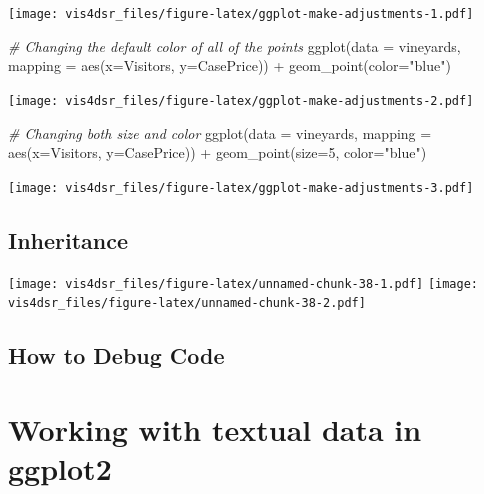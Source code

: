 \documentclass[
]{krantz}
\makeatletter
\newenvironment{Shaded}{\begin{snugshade}}{\end{snugshade}}
\newcommand{\AttributeTok}[1]{\textcolor[rgb]{0.61,0.61,0.61}{#1}}
\newcommand{\CommentTok}[1]{\textcolor[rgb]{0.37,0.37,0.37}{\textit{#1}}}
\newcommand{\DecValTok}[1]{\textcolor[rgb]{0.06,0.06,0.06}{#1}}
\newcommand{\FunctionTok}[1]{\textcolor[rgb]{0,0,0}{#1}}
\newcommand{\NormalTok}[1]{#1}
\newcommand{\SpecialCharTok}[1]{\textcolor[rgb]{0,0,0}{#1}}
\newcommand{\StringTok}[1]{\textcolor[rgb]{0.5,0.5,0.5}{#1}}
\newenvironment{kframe}{%
\medskip{}
\setlength{\fboxsep}{.8em}
 \def\at@end@of@kframe{}%
 \ifinner\ifhmode%
  \def\at@end@of@kframe{\end{minipage}}%
  \begin{minipage}{\columnwidth}%
 \fi\fi%
 \def\FrameCommand##1{\hskip\@totalleftmargin \hskip-\fboxsep
 \colorbox{shadecolor}{##1}\hskip-\fboxsep
     \hskip-\linewidth \hskip-\@totalleftmargin \hskip\columnwidth}%
 \MakeFramed {\advance\hsize-\width
   \@totalleftmargin\z@ \linewidth\hsize
   \@setminipage}}%
 {\par\unskip\endMakeFramed%
 \at@end@of@kframe}
\renewenvironment{Shaded}{\begin{kframe}}{\end{kframe}}
\makeatother
\begin{document}
\texttt{[image: vis4dsr\_files/figure-latex/ggplot-make-adjustments-1.pdf]}

\begin{Shaded}
\begin{Highlighting}[]
\CommentTok{\# Changing the default color of all of the points}
\FunctionTok{ggplot}\NormalTok{(}\AttributeTok{data =}\NormalTok{ vineyards, }\AttributeTok{mapping =} \FunctionTok{aes}\NormalTok{(}\AttributeTok{x=}\NormalTok{Visitors, }\AttributeTok{y=}\NormalTok{CasePrice)) }\SpecialCharTok{+}
  \FunctionTok{geom\_point}\NormalTok{(}\AttributeTok{color=}\StringTok{"blue"}\NormalTok{)}
\end{Highlighting}
\end{Shaded}

\texttt{[image: vis4dsr\_files/figure-latex/ggplot-make-adjustments-2.pdf]}

\begin{Shaded}
\begin{Highlighting}[]
\CommentTok{\# Changing both size and color}
\FunctionTok{ggplot}\NormalTok{(}\AttributeTok{data =}\NormalTok{ vineyards, }\AttributeTok{mapping =} \FunctionTok{aes}\NormalTok{(}\AttributeTok{x=}\NormalTok{Visitors, }\AttributeTok{y=}\NormalTok{CasePrice)) }\SpecialCharTok{+}
  \FunctionTok{geom\_point}\NormalTok{(}\AttributeTok{size=}\DecValTok{5}\NormalTok{, }\AttributeTok{color=}\StringTok{"blue"}\NormalTok{)}
\end{Highlighting}
\end{Shaded}

\texttt{[image: vis4dsr\_files/figure-latex/ggplot-make-adjustments-3.pdf]}

\hypertarget{inheritance}{%
\section{Inheritance}\label{inheritance}}

\texttt{[image: vis4dsr\_files/figure-latex/unnamed-chunk-38-1.pdf]} \texttt{[image: vis4dsr\_files/figure-latex/unnamed-chunk-38-2.pdf]}

\hypertarget{how-to-debug-code}{%
\section{How to Debug Code}\label{how-to-debug-code}}

\hypertarget{text-data-visualizations}{%
\chapter{Working with textual data in ggplot2}\label{text-data-visualizations}}
\end{document}

